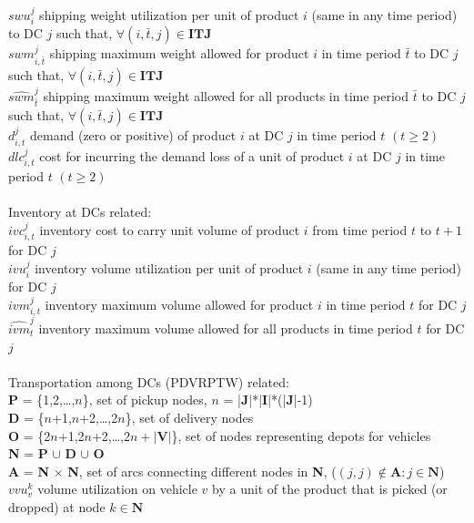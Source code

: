 \documentclass[11pt,letter]{article}
\begin{document}
$swu_{i}^{j}$ \quad shipping weight utilization per unit of product $i$ (same in any time period) to DC $j$ such that, $\forall (i,\bar{t},j)\in \textbf{ITJ}$\\
$swm_{i,\bar{t}}^{j}$ \quad shipping maximum weight allowed for product $i$ in time period $\bar{t}$ to DC $j$ such that, $\forall (i,\bar{t},j)\in \textbf{ITJ}$\\
$\widehat{swm}_{\bar{t}}^{j}$ \quad shipping maximum weight allowed for all products in time period $\bar{t}$ to DC $j$ such that, $\forall (i,\bar{t},j)\in \textbf{ITJ}$\\
$d_{i,t}^{j}$ \quad demand (zero or positive) of product $i$ at DC $j$ in time period $t$ $(t\geq 2)$ \\
$dlc_{i,t}^{j}$ \quad cost for incurring the demand loss of a unit of product $i$ at DC $j$ in time period $t$ $(t\geq 2)$ \\
\\
Inventory at DCs related: \\
$ivc_{i,t}^{j}$ \quad inventory cost to carry unit volume of product $i$ from time period $t$ to $t+1$ for DC $j$ \\
$ivu_{i}^{j}$ \quad inventory volume utilization per unit of product $i$ (same in any time period) for DC $j$ \\
$ivm_{i,t}^{j}$ \quad inventory maximum volume allowed for product $i$ in time period $t$ for DC $j$ \\
$\widehat{ivm}_{t}^{j}$ \quad inventory maximum volume allowed for all products in time period $t$ for DC $j$ \\
\\
Transportation among DCs (PDVRPTW) related: \\
\textbf{P} \quad = \{1,2,\ldots ,$n$\}, set of pickup nodes, $n$ = |\textbf{J}|*|\textbf{I}|*(|\textbf{J}|-1) \\
\textbf{D} \quad = \{$n$+1,$n$+2,\ldots ,2$n$\}, set of delivery nodes \\
\textbf{O} \quad = \{2$n$+1,2$n$+2,\ldots ,$2n+|\textbf{V}|$\}, set of nodes representing depots for vehicles \\
\textbf{N} \quad = \textbf{P} $\cup$ \textbf{D} $\cup$ \textbf{O} \\
\textbf{A} \quad = \textbf{N} $\times$ \textbf{N}, set of arcs connecting different nodes in \textbf{N}, ($(j,j)\not \in \textbf{A}\colon j\in \textbf{N}$) \\
$vvu_{v}^{k}$ \quad volume utilization on vehicle $v$ by a unit of the product that is picked (or dropped) at node $k\in \textbf{N}$ \\
\end{document}
